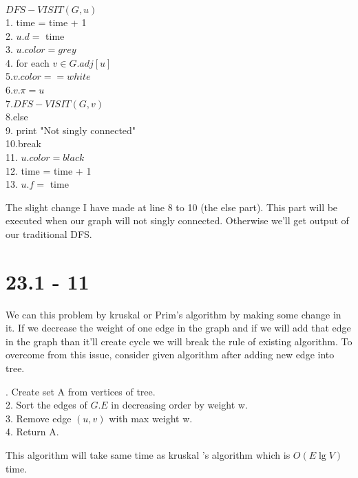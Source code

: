 \documentclass[a4paper, 11pt]{article}
\begin{document}
\vspace{5mm}
\noindent
$DFS-VISIT(G,u)$\\
1. time = time + 1\\
2. $u.d = $ time\\
3. $u.color = grey$\\
4. for each $v \in G.adj[u]$\\
5.\hspace{0.7cm}$v.color == white$\\
6.\hspace{1.4cm}$v.\pi = u$\\
7.\hspace{1.4cm}$DFS-VISIT(G,v)$\\
8.\hspace{0.7cm}else\\
9.\hspace{1.4cm} print "Not singly connected"\\
10.\hspace{1.4cm}break\\
11. $u.color = black$\\
12. time = time + 1\\
13. $u.f = $ time

\vspace{5mm}
\noindent
The slight change I have made at line 8 to 10 (the else part). This part will be executed when our graph will not singly connected. Otherwise we'll get output of our traditional DFS.

\section{23.1 - 11}
We can this problem by kruskal or Prim's algorithm by making some change in it. If we decrease the weight of one edge in the graph and if we will add that edge in the graph than it'll create cycle we will break the rule of existing algorithm. To overcome from this issue, consider given algorithm after adding new edge into tree.

\vspace{5mm}
. Create set A from vertices of tree.\\
2. Sort the edges of $G.E$ in decreasing order by weight w.\\
3. Remove edge $(u,v)$ with max weight w.\\
4. Return A.

\vspace{5mm}
\noindent
This algorithm will take same time as kruskal 's algorithm which is $O(E\lg V) $ 
time.
\end{document}
